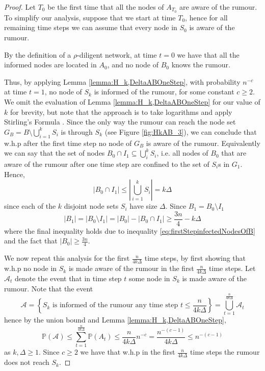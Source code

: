 
\begin{proof} 
	Let $T_0$ be the first time that all the nodes of $A_{T_0}$ are aware of the rumour. To simplify our analysis, suppose that we start at time $T_0$, hence for all remaining time steps we can assume that every node in $S_0$ is aware of the rumour.

	By the definition of a $\rho$-diligent network, at time $t=0$  we have that all the informed nodes are located in $A_0$, and no node of $B_0$ knows the rumour. 
	
	Thus, by applying Lemma \ref{lemma:H_k,DeltaABOneStep}, with probability $n^{-c}$ at time $t = 1$, no node of $S_k$ is informed of the rumour, for some constant $c \geq 2$. We omit the evaluation of Lemma \ref{lemma:H_k,DeltaABOneStep} for our value of $k$ for brevity, but note that the approach is to take logarithms and apply Stirling's Formula \cite{stirling}. Since the only way the rumour can reach the node set $G_B = B \setminus \bigcup_{i=1}^k S_i$ is through $S_k$ (see Figure \ref{fig:HkAB_3}), we can conclude that w.h.p after the first time step no node of $G_B$ is aware of the rumour. Equivalently we can say that the set of nodes $B_0 \cap I_1 \subseteq \bigcup_i^k S_i$, i.e. all nodes of $B_0$ that are aware of the rumour after one time step are confined to the set of $S_i$s in $G_1$. Hence, 
	\begin{equation}\label{eq:firstStepinfectedNodesOfB}
		|B_0 \cap I_1| \leq \left|\bigcup_{i=1}^k S_i\right| = k\Delta
	\end{equation}
	since each of the $k$ disjoint node sets $S_i$ have size $\Delta$. Since $B_1 = B_0 \setminus I_1$
	$$
		|B_1| = |B_0 \setminus I_1| = |B_0| - |B_0 \cap I_1| \geq \frac{3n}{4} - k\Delta
	$$
	where the final inequality holds due to inequality \ref{eq:firstStepinfectedNodesOfB} and the fact that $|B_0| \geq \frac{3n}{4}$. 

	We now repeat this analysis for the first $\frac{n}{4k\Delta}$ time steps, by first showing that w.h.p no node in $S_k$ is made aware of the rumour in the first $\frac{n}{4k\Delta}$ time steps. Let $\mathcal{A}_t$ denote the event that in time step $t$ some node in $S_k$ is made aware of the rumour. Note that the event 
	$$\mathcal{A} = \left\{S_k \text{ is informed of the rumour any time step } t \leq \frac{n}{4k\Delta} \right\} = \bigcup_{t=1}^\frac{n}{4k\Delta} \mathcal{A}_t
	$$
	hence by the union bound and Lemma \ref{lemma:H_k,DeltaABOneStep},
	$$
		\mathbb{P}(\mathcal{A}) 
		\leq \sum_{t=1}^\frac{n}{4k\Delta} \mathbb{P}(A_t) 
		\leq \frac{n}{4k\Delta}n^{-c}
		= \frac{n^{-(c-1)}}{4k\Delta} \leq n^{-(c-1)}
	$$
	as $k, \Delta \geq 1$. Since $c \geq 2$
	we have that w.h.p in the first $\frac{n}{4k\Delta}$ time steps the rumour does not reach $S_k$.


\end{proof}
